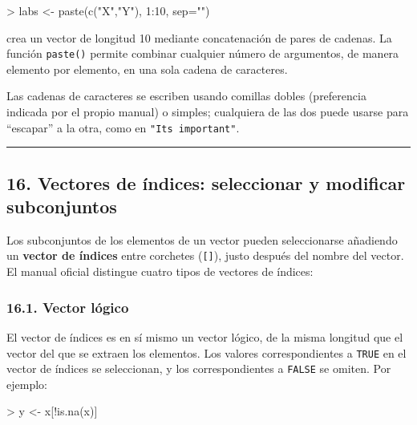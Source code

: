 \documentclass[
  jou,
  floatsintext,
  longtable,
  a4paper,
  nolmodern,
  notxfonts,
  notimes,
  12pt,
  colorlinks=true,linkcolor=blue,citecolor=blue,urlcolor=blue]{apa7}
\newenvironment{Shaded}{\begin{snugshade}}{\end{snugshade}}
\newcommand{\AttributeTok}[1]{\textcolor[rgb]{0.40,0.45,0.13}{#1}}
\newcommand{\DecValTok}[1]{\textcolor[rgb]{0.68,0.00,0.00}{#1}}
\newcommand{\FunctionTok}[1]{\textcolor[rgb]{0.28,0.35,0.67}{#1}}
\newcommand{\NormalTok}[1]{\textcolor[rgb]{0.00,0.23,0.31}{#1}}
\newcommand{\OtherTok}[1]{\textcolor[rgb]{0.00,0.23,0.31}{#1}}
\newcommand{\SpecialCharTok}[1]{\textcolor[rgb]{0.37,0.37,0.37}{#1}}
\newcommand{\StringTok}[1]{\textcolor[rgb]{0.13,0.47,0.30}{#1}}
\begin{document}
\begin{Shaded}
\begin{Highlighting}[]
\SpecialCharTok{\textgreater{}}\NormalTok{ labs }\OtherTok{\textless{}{-}} \FunctionTok{paste}\NormalTok{(}\FunctionTok{c}\NormalTok{(}\StringTok{"X"}\NormalTok{,}\StringTok{"Y"}\NormalTok{), }\DecValTok{1}\SpecialCharTok{:}\DecValTok{10}\NormalTok{, }\AttributeTok{sep=}\StringTok{""}\NormalTok{)}
\end{Highlighting}
\end{Shaded}

crea un vector de longitud 10 mediante concatenación de pares de
cadenas. La función \texttt{paste()} permite combinar cualquier número
de argumentos, de manera elemento por elemento, en una sola cadena de
caracteres.

Las cadenas de caracteres se escriben usando comillas dobles
(preferencia indicada por el propio manual) o simples; cualquiera de las
dos puede usarse para ``escapar'' a la otra, como en
\texttt{"It\textquotesingle{}s\ important"}.

\begin{center}\rule{0.5\linewidth}{0.5pt}\end{center}

\subsection{16. Vectores de índices: seleccionar y modificar
subconjuntos}\label{vectores-de-uxedndices-seleccionar-y-modificar-subconjuntos}

Los subconjuntos de los elementos de un vector pueden seleccionarse
añadiendo un \textbf{vector de índices} entre corchetes
(\texttt{{[}{]}}), justo después del nombre del vector. El manual
oficial distingue cuatro tipos de vectores de índices:

\subsubsection{16.1. Vector lógico}\label{vector-luxf3gico}

El vector de índices es en sí mismo un vector lógico, de la misma
longitud que el vector del que se extraen los elementos. Los valores
correspondientes a \texttt{TRUE} en el vector de índices se seleccionan,
y los correspondientes a \texttt{FALSE} se omiten. Por ejemplo:

\begin{Shaded}
\begin{Highlighting}[]
\SpecialCharTok{\textgreater{}}\NormalTok{ y }\OtherTok{\textless{}{-}}\NormalTok{ x[}\SpecialCharTok{!}\FunctionTok{is.na}\NormalTok{(x)]}
\end{Highlighting}
\end{Shaded}
\end{document}
